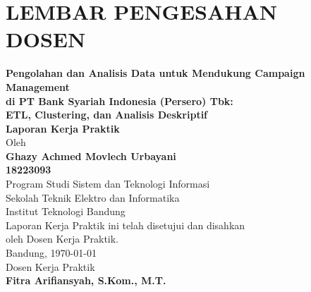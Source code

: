 \chapter*{LEMBAR PENGESAHAN DOSEN}
\begin{center}
\vspace{0.8cm}
{\large\bfseries Pengolahan dan Analisis Data untuk Mendukung Campaign Management\\
di PT Bank Syariah Indonesia (Persero) Tbk:\\
ETL, Clustering, dan Analisis Deskriptif}\\
\vspace{1.0cm}
{\Large \textbf{Laporan Kerja Praktik}}\\
\vspace{0.8cm}
{\large Oleh}\\[0.3cm]
\textbf{{\large Ghazy Achmed Movlech Urbayani}\\{\large 18223093}}\\
\vspace{0.35cm}
{\large Program Studi Sistem dan Teknologi Informasi}\\
{\large Sekolah Teknik Elektro dan Informatika}\\
{\large Institut Teknologi Bandung}\\
\vspace{1.0cm}
Laporan Kerja Praktik ini telah disetujui dan disahkan\\
oleh Dosen Kerja Praktik.\\[0.6cm]
Bandung, \today\\[0.7cm]
Dosen Kerja Praktik\\[2.2cm]
\textbf{Fitra Arifiansyah, S.Kom., M.T.}
\end{center}

